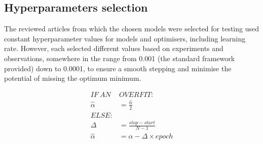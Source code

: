 \subsection{Hyperparameters selection} \label{subsec:l-rate}
%
The reviewed articles from which the chosen models were selected for testing used constant hyperparameter values for models and optimisers, including learning rate.
However, each selected different values based on experiments and observations, somewhere in the range from 0.001 (the standard framework provided) down to 0.0001, to ensure a smooth stepping and minimise the potential of missing the optimum minimum.

%
\begin{equation}
  \begin{split}
    IF \ AN \ & OVERFIT: \\
      \hat{\alpha} &= \frac{\hat{\alpha} }{2} \\
    ELSE: & \\
      \Delta &= \frac{stop - start}{N-1} \\
      \hat{\alpha} &= \alpha - \Delta \times epoch
    \label{eq:scheduler}
  \end{split}
\end{equation}
